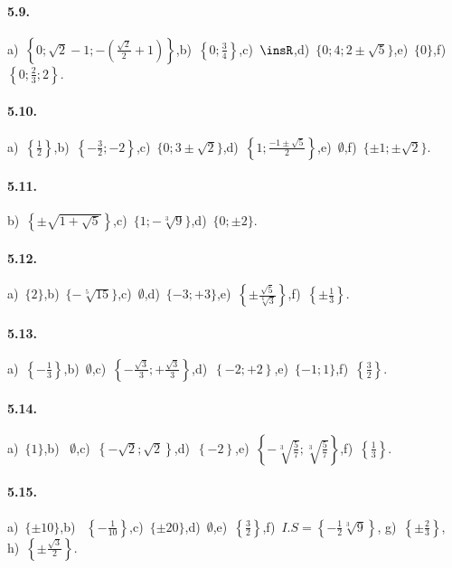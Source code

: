 \paragraph{5.9.} a)~$\left\{0;\sqrt 2-1;-\left(\frac{\sqrt 2} 2+1\right)\right\}$,\quad b)~$\left\{0;\frac 3 4\right\}$,\quad c)~$\insR$,\quad d)~$\{0;4;2\pm \sqrt 5\}$,\quad e)~$\{0\}$,\quad f)~$\left\{0;\frac 2 3;2\right\}$.

\paragraph{5.10.} a)~$\left\{\frac 1 2\right\}$,\quad b)~$\left\{-\frac 3 2;-2\right\}$,\quad c)~$\{0;3\pm \sqrt 2\}$,\quad d)~$\left\{1;\frac{-1\pm \sqrt 5} 2\right\}$,\quad e)~$\emptyset $,\quad f)~$\{\pm 1;\pm \sqrt 2\}$.

\paragraph{5.11.} b)~$\left\{\pm \sqrt{1+\sqrt 5}\right\}$,\quad c)~$\{1;-\sqrt[3]9\}$,\quad d)~$\{0;\pm 2\}$.

\paragraph{5.12.} a)~$\{2\}$,\quad b)~$\{-\sqrt[5]{15}\}$,\quad c)~$\emptyset $,\quad d)~$\{-3;+3\}$,\quad e)~$\left\{\pm \frac{\sqrt 5}{\sqrt[6]3}\right\}$,\quad f)~$\left\{\pm \frac 1 3\right\}$.

\paragraph{5.13.} a)~$\left\{-\frac 1 3\right\}$,\quad b)~$\emptyset $,\quad c)~$\left\{-\frac{\sqrt 3} 3;+\frac{\sqrt 3} 3\right\}$,\quad d)~$\left\{-2;+2\right\}$,\quad e)~$\{-1;1\}$,\quad f)~$\left\{\frac 3 2\right\}$.

\paragraph{5.14.} a)~$\{1\}$,\quad b)~ $\emptyset $,\quad c)~$\left\{-\sqrt 2;\sqrt 2\right\}$,\quad d)~$\left\{-2\right\}$,\quad e)~$\left\{-\sqrt[3]{\frac 5 7};\sqrt[3]{\frac 5 7}\right\}$,\quad f)~$\left\{\frac 1 3\right\}$.

\paragraph{5.15.} a)~$\{\pm 10\}$,\quad b)~ $\left\{-\frac 1{10}\right\}$,\quad c)~$\{\pm 20\}$,\quad d)~$\emptyset $,\quad e)~$\left\{\frac 3 2\right\}$,\quad f)~${I.S}=\left\{-\frac 1 2\sqrt[3]9\right\}$, \quad
g)~$\left\{\pm \frac 2 3\right\}$,\protect\\
h)~$\left\{\pm \frac{\sqrt 3} 2\right\}$.


